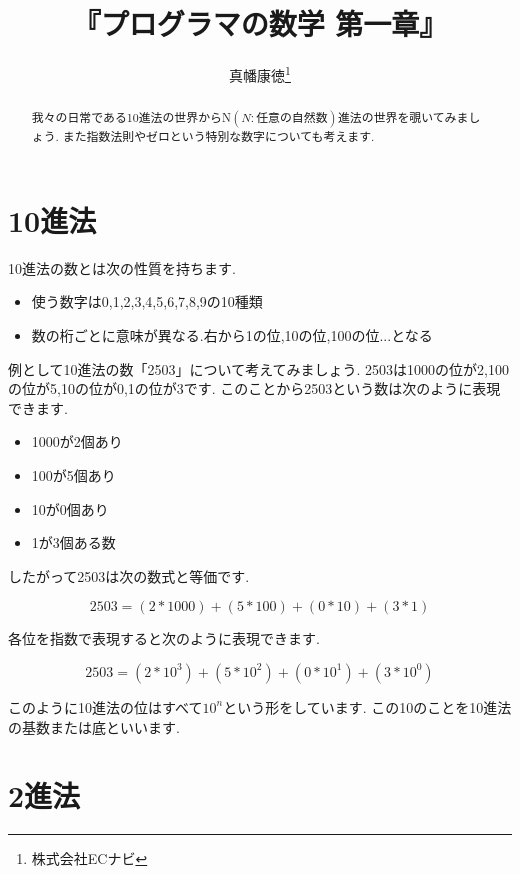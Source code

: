 \documentclass[10pt, twocolumn]{jarticle}
\title{『プログラマの数学 第一章』}
\author{真幡康徳\thanks{株式会社ECナビ}}
\begin{document}
\maketitle
\begin{abstract}
我々の日常である10進法の世界からN$(N:任意の自然数)$進法の世界を覗いてみましょう.
また指数法則やゼロという特別な数字についても考えます.
\end{abstract}

\section{10進法}

10進法の数とは次の性質を持ちます.

\begin{itemize}
  \item 使う数字は0,1,2,3,4,5,6,7,8,9の10種類
  \item 数の桁ごとに意味が異なる.右から1の位,10の位,100の位...となる
\end{itemize}

例として10進法の数「2503」について考えてみましょう.
2503は1000の位が2,100の位が5,10の位が0,1の位が3です.
このことから2503という数は次のように表現できます.

\begin{itemize}
  \item 1000が2個あり
  \item 100が5個あり
  \item 10が0個あり
  \item 1が3個ある数
\end{itemize}

したがって2503は次の数式と等価です.

\begin{displaymath}2503 = (2 * 1000) + (5 * 100) + (0 * 10) + (3 * 1)\end{displaymath}

各位を指数で表現すると次のように表現できます.

\begin{displaymath}
2503 = (2 * 10^3) + (5 * 10^2) + (0 * 10^1) + (3 * 10^0)
\end{displaymath}

このように10進法の位はすべて$10^n$という形をしています.
この10のことを10進法の基数または底といいます.

\section{2進法}
\end{document}

